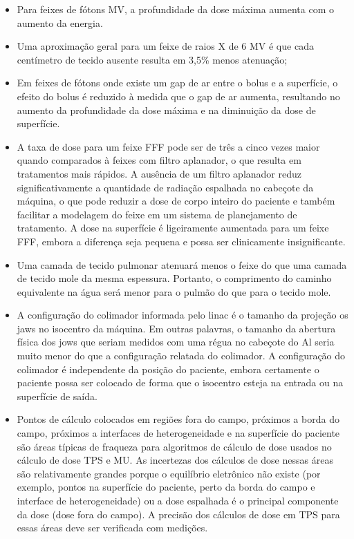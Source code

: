 \documentclass[11pt,a4paper]{article}
\newcounter{exemplo}
\begin{document}
\begin{itemize}
    \item Para feixes de fótons MV, a profundidade da dose máxima aumenta com o aumento da energia.
    
    \item Uma aproximação geral para um feixe de raios X de 6 MV é que cada centímetro de tecido ausente resulta em 3,5\% menos atenuação;
    
    \item Em feixes de fótons onde existe um gap de ar entre o bolus e a superfície, o efeito do bolus é reduzido à medida que o gap de ar aumenta, resultando no aumento da profundidade da dose máxima e na diminuição da dose de superfície.
    
    \item A taxa de dose para um feixe FFF pode ser de três a cinco vezes maior quando comparados à feixes com filtro aplanador, o que resulta em tratamentos mais rápidos. A ausência de um filtro aplanador reduz significativamente a quantidade de radiação espalhada no cabeçote da máquina, o que pode reduzir a dose de corpo inteiro do paciente e também facilitar a modelagem do feixe em um sistema de planejamento de tratamento. A dose na superfície é ligeiramente aumentada para um feixe FFF, embora a diferença seja pequena e possa ser clinicamente insignificante.
    
    \item Uma camada de tecido pulmonar atenuará menos o feixe do que uma camada de tecido mole da mesma espessura. Portanto, o comprimento do caminho equivalente na água será menor para o pulmão do que para o tecido mole.
    
    \item A configuração do colimador informada pelo linac é o tamanho da projeção os jaws no isocentro da máquina. Em outras palavras, o tamanho da abertura física dos jows que seriam medidos com uma régua no cabeçote do Al seria muito menor do que a configuração relatada do colimador. A configuração do colimador é independente da posição do paciente, embora certamente o paciente possa ser colocado de forma que o isocentro esteja na entrada ou na superfície de saída.
    
    \item Pontos de cálculo colocados em regiões fora do campo, próximos a borda do campo, próximos a interfaces de heterogeneidade e na superfície do paciente são áreas típicas de fraqueza para algoritmos de cálculo de dose usados no cálculo de dose TPS e MU. As incertezas dos cálculos de dose nessas áreas são relativamente grandes porque o equilíbrio eletrônico não existe (por exemplo, pontos na superfície do paciente, perto da borda do campo e interface de heterogeneidade) ou a dose espalhada é o principal componente da dose (dose fora do campo). A precisão dos cálculos de dose em TPS para essas áreas deve ser verificada com medições.
\end{itemize}



\end{document}
